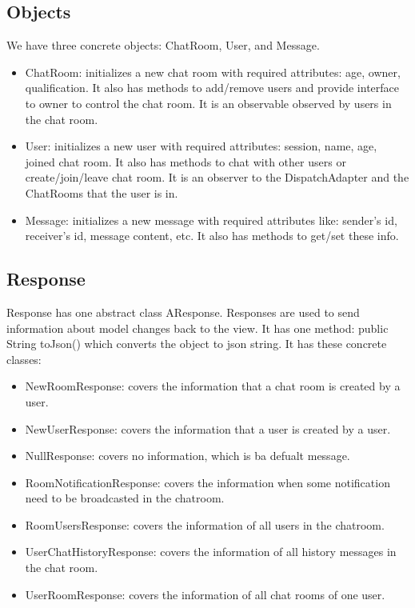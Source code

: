 \documentclass[letterpaper, 11pt]{article}
\begin{document}
\subsection{Objects}
We have three concrete objects: ChatRoom, User, and Message.
\begin{itemize}
\item ChatRoom: initializes a new chat room with required attributes: age, owner, qualification. It also has methods to add/remove users and provide interface to owner to control the chat room. It is an observable observed by users in the chat room.
\item User: initializes a new user with required attributes: session, name, age, joined chat room. It also has methods to chat with other users or create/join/leave chat room. It is an observer to the DispatchAdapter and the ChatRooms that the user is in.
\item Message: initializes a new message with required attributes like: sender's id, receiver's id, message content, etc. It also has methods to get/set these info.
\end{itemize}

\subsection{Response}
Response has one abstract class AResponse. Responses are used to send information about model changes back to the view. It has one method: public String toJson() which converts the object to json string. It has these concrete classes:
\begin{itemize}
\item NewRoomResponse: covers the information that a chat room is created by a user.
\item NewUserResponse: covers the information that a user is created by a user.
\item NullResponse: covers no information, which is ba defualt message.
\item RoomNotificationResponse: covers the information when some notification need to be broadcasted in the chatroom. 
\item RoomUsersResponse: covers the information of all users in the chatroom.
\item UserChatHistoryResponse: covers the information of all history messages in the chat room.
\item UserRoomResponse: covers the information of all chat rooms of one user.
\end{itemize}
\end{document}
